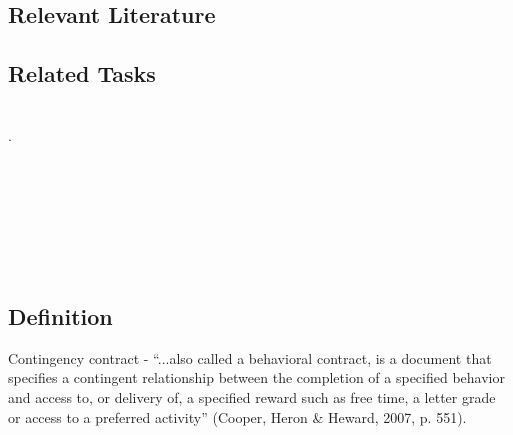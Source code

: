 \subsection{Relevant Literature}
\begin{refsection}
\nocite{test,alang2017police,clayton2018black}
\printbibliography[heading=none]
\end{refsection}
%
\subsection{Related Tasks}
\fourdOne{}\\.
\fourdSixteen{}\\
\fourkTwo{}\\
\fourFKThirty{}\\
\fourFKThirtyOne{}\\
\fourFKThirtyThree{}\\
\fourFKFourtyOne{}\\
\fourFKFourtyTwo{}\\
%
%
%
%
%
%
%
%
%
\section[\foureFour{}]{\foureFour{}%
              }
\subsection{Definition}
Contingency contract -  ``...also called a behavioral contract, is a document that specifies a contingent relationship between the completion of a specified behavior and access to, or delivery of, a specified reward such as free time, a letter grade or access to a preferred activity'' (Cooper, Heron \& Heward, 2007, p. 551). 

